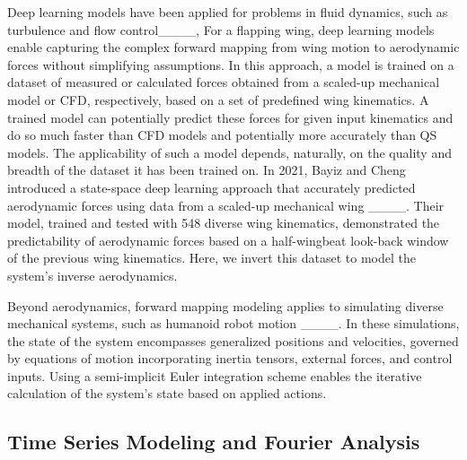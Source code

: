 Deep learning models have been applied for problems in fluid dynamics, such as turbulence and flow control____, 
For a flapping wing, deep learning models enable capturing the complex forward mapping from wing motion to aerodynamic forces without simplifying assumptions. In this approach, a model is trained on a dataset of measured or calculated forces obtained from a scaled-up mechanical model or CFD, respectively, based on a set of predefined wing kinematics. A trained model can potentially predict these forces for given input kinematics and do so much faster than CFD models and potentially more accurately than QS models. The applicability of such a model depends, naturally, on the quality and breadth of the dataset it has been trained on.
In 2021, Bayiz and Cheng introduced a state-space deep learning approach that accurately predicted aerodynamic forces using data from a scaled-up mechanical wing ____. Their model, trained and tested with 548 diverse wing kinematics, demonstrated the predictability of aerodynamic forces based on a half-wingbeat look-back window of the previous wing kinematics. Here, we invert this dataset to model the system's inverse aerodynamics.

Beyond aerodynamics, forward mapping modeling applies to simulating diverse mechanical systems, such as humanoid robot motion ____. In these simulations, the state of the system encompasses generalized positions and velocities, governed by equations of motion incorporating inertia tensors, external forces, and control inputs. Using a semi-implicit Euler integration scheme enables the iterative calculation of the system's state based on applied actions. %

\subsection{Time Series Modeling and Fourier Analysis}

